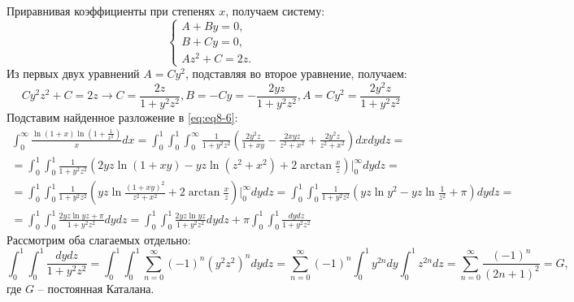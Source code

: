\documentclass[11pt]{article}
\begin{document}
Приравнивая коэффициенты при степенях $x$, получаем систему:
\begin{equation*}
\begin{cases}
A + By = 0, \\
B + Cy = 0, \\
Az^2 + C = 2z.
\end{cases}
\end{equation*}
Из первых двух уравнений $A = Cy^2$, подставляя во второе уравнение, получаем:
\begin{equation*}
Cy^2z^2 + C = 2z \rightarrow C = \frac{2z}{1 + y^2z^2}, B = -Cy = -\frac{2yz}{1 + y^2z^2}, A = Cy^2 = \frac{2y^2z}{1 + y^2z^2}
\end{equation*}
Подставим найденное разложение в \eqref{eq:eq8-6}:
\begin{multline}\label{eq:eq8-7}
\int_0^{\infty}\frac{\ln(1 + x)\ln\left(1 + \frac1{x^2}\right)}xdx = \int_0^1\int_0^1\int_0^{\infty}\frac1{1 + y^2z^2}\left(\frac{2y^2z}{1 + xy} - \frac{2xyz}{z^2 + x^2} + \frac{2y^2z}{z^2 + x^2}\right)dxdydz = \\
= \int_0^1\int_0^1\frac1{1 + y^2z^2}\left(2yz\ln(1 + xy) - yz\ln(z^2 + x^2) + 2\arctan{\frac{x}z}\right)\bigg|_0^{\infty}dydz = \\
= \int_0^1\int_0^1\frac1{1 + y^2z^2}\left(yz\ln\frac{(1 + xy)^2}{z^2 + x^2} + 2\arctan{\frac{x}z}\right)\bigg|_0^{\infty}dydz = \int_0^1\int_0^1\frac1{1 + y^2z^2}\left(yz\ln y^2 - yz\ln\frac1{z^2} + \pi\right)dydz = \\
= \int_0^1\int_0^1\frac{2yz\ln yz + \pi}{1 + y^2z^2}dydz = \int_0^1\int_0^1\frac{2yz\ln yz}{1 + y^2z^2}dydz + \pi\int_0^1\int_0^1\frac{dydz}{1 + y^2z^2}
\end{multline}
Рассмотрим оба слагаемых отдельно:
\begin{equation}\label{eq:eq8-8}
\int_0^1\int_0^1\frac{dydz}{1 + y^2z^2} = \int_0^1\int_0^1\sum_{n = 0}^{\infty}(-1)^n(y^2z^2)^ndydz = \sum_{n = 0}^{\infty}(-1)^n\int_0^1y^{2n}dy\int_0^1z^{2n}dz = \sum_{n = 0}^{\infty}\frac{(-1)^n}{(2n + 1)^2} = G,
\end{equation}
где $G$ -- постоянная Каталана.
\end{document}
